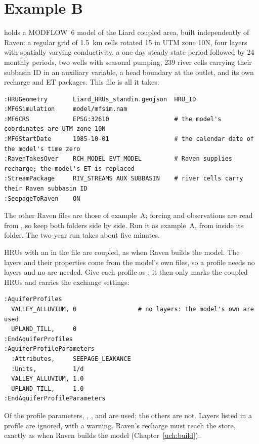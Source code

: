 \section{Example B}
 holds a MODFLOW~6 model of the Liard coupled area, built independently of Raven:
a regular grid of 1.5~km cells rotated 15\textdegree{} in UTM zone 10N, four layers with spatially varying conductivity,
a one-day steady-state period followed by 24 monthly periods, two wells with seasonal pumping, 239 river cells carrying
their subbasin ID in an auxiliary variable, a head boundary at the outlet, and its own recharge and ET packages. This
 file is all it takes:
\begin{whattowrite}
\small
\begin{lstlisting}
:HRUGeometry       Liard_HRUs_standin.geojson  HRU_ID
:MF6Simulation     model/mfsim.nam
:MF6CRS            EPSG:32610                  # the model's coordinates are UTM zone 10N
:MF6StartDate      1985-10-01                  # the calendar date of the model's time zero
:RavenTakesOver    RCH_MODEL EVT_MODEL         # Raven supplies recharge; the model's ET is replaced
:StreamPackage     RIV_STREAMS AUX SUBBASIN    # river cells carry their Raven subbasin ID
:SeepageToRaven    ON
\end{lstlisting}
\end{whattowrite}
The other Raven files are those of example~A; forcing and observations are read from , so keep
both folders side by side. Run it as example~A, from inside its folder. The two-year run takes about five minutes.

HRUs with an  in the  file are coupled, as when Raven builds the model. The layers and
their properties come from the model's own files, so a profile needs no layers and no  are needed.
Give each profile as ; it then only marks the coupled HRUs and carries the exchange settings:
\begin{lstlisting}
:AquiferProfiles
  VALLEY_ALLUVIUM, 0                 # no layers: the model's own are used
  UPLAND_TILL,     0
:EndAquiferProfiles
:AquiferProfileParameters
  :Attributes,     SEEPAGE_LEAKANCE
  :Units,          1/d
  VALLEY_ALLUVIUM, 1.0
  UPLAND_TILL,     1.0
:EndAquiferProfileParameters
\end{lstlisting}
Of the profile parameters, , ,  and
 are used; the others are not. Layers listed in a profile are ignored, with a warning. Raven's
recharge must reach the  store, exactly as when Raven builds the model (Chapter~\ref{uch:build}).

